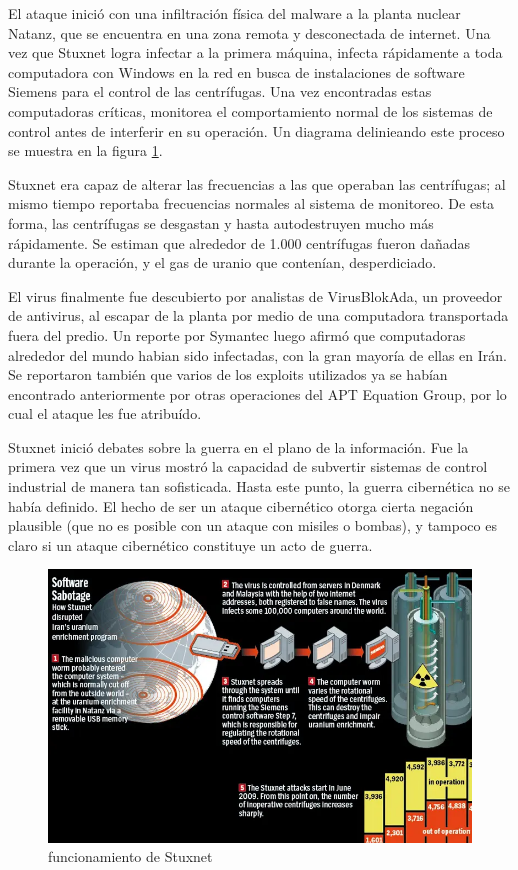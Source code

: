 \documentclass{article}
\begin{document}
El ataque inició con una infiltración física del malware a la planta nuclear Natanz, que se encuentra en una zona remota y desconectada de internet. Una vez que Stuxnet logra infectar a la primera máquina, infecta rápidamente a toda computadora con Windows en la red en busca de instalaciones de software Siemens para el control de las centrífugas. Una vez encontradas estas computadoras críticas, monitorea el comportamiento normal de los sistemas de control antes de interferir en su operación. Un diagrama delinieando este proceso se muestra en la figura \ref{fig:stuxnet}.

Stuxnet era capaz de alterar las frecuencias a las que operaban las centrífugas; al mismo tiempo reportaba frecuencias normales al sistema de monitoreo. De esta forma, las centrífugas se desgastan y hasta autodestruyen mucho más rápidamente. Se estiman que alrededor de 1.000 centrífugas fueron dañadas durante la operación, y el gas de uranio que contenían, desperdiciado. \autocite{zetter-stuxnet} \autocite{washingtonpost-stuxnet}

El virus finalmente fue descubierto por analistas de VirusBlokAda, un proveedor de antivirus, al escapar de la planta por medio de una computadora transportada fuera del predio. Un reporte por Symantec luego afirmó que computadoras alrededor del mundo habian sido infectadas, con la gran mayoría de ellas en Irán. Se reportaron también que varios de los exploits utilizados ya se habían encontrado anteriormente por otras operaciones del APT Equation Group, por lo cual el ataque les fue atribuído. \autocite{infoworld-stuxnet} 

Stuxnet inició debates sobre la guerra en el plano de la información. Fue la primera vez que un virus mostró la capacidad de subvertir sistemas de control industrial de manera tan sofisticada. Hasta este punto, la guerra cibernética no se había definido. El hecho de ser un ataque cibernético otorga cierta negación plausible (que no es posible con un ataque con misiles o bombas), y tampoco es claro si un ataque cibernético constituye un acto de guerra. \autocite{washingtonpost-stuxnet-2} \autocite{darknetdiaries-stuxnet}

\begin{figure}[t]
    \centering
    \includegraphics[width=1.0\textwidth]{Stuxnet_jpg.png}
    \caption{funcionamiento de Stuxnet \autocite{extremetech-stuxnet}}
    \label{fig:stuxnet}
\end{figure}
\end{document}
